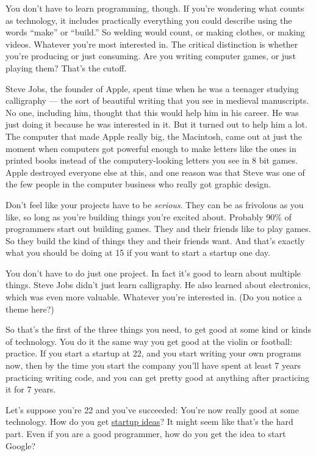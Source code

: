 You don't have to learn programming, though. If you're wondering what
counts as technology, it includes practically everything you could
describe using the words ``make'' or ``build.'' So welding would count,
or making clothes, or making videos. Whatever you're most interested in.
The critical distinction is whether you're producing or just consuming.
Are you writing computer games, or just playing them? That's the cutoff.

Steve Jobs, the founder of Apple, spent time when he was a teenager
studying calligraphy --- the sort of beautiful writing that you see in
medieval manuscripts. No one, including him, thought that this would
help him in his career. He was just doing it because he was interested
in it. But it turned out to help him a lot. The computer that made Apple
really big, the Macintosh, came out at just the moment when computers
got powerful enough to make letters like the ones in printed books
instead of the computery-looking letters you see in 8 bit games. Apple
destroyed everyone else at this, and one reason was that Steve was one
of the few people in the computer business who really got graphic
design.

Don't feel like your projects have to be \emph{serious}. They can be as
frivolous as you like, so long as you're building things you're excited
about. Probably 90\% of programmers start out building games. They and
their friends like to play games. So they build the kind of things they
and their friends want. And that's exactly what you should be doing at
15 if you want to start a startup one day.

You don't have to do just one project. In fact it's good to learn about
multiple things. Steve Jobs didn't just learn calligraphy. He also
learned about electronics, which was even more valuable. Whatever you're
interested in. (Do you notice a theme here?)

So that's the first of the three things you need, to get good at some
kind or kinds of technology. You do it the same way you get good at the
violin or football: practice. If you start a startup at 22, and you
start writing your own programs now, then by the time you start the
company you'll have spent at least 7 years practicing writing code, and
you can get pretty good at anything after practicing it for 7 years.

Let's suppose you're 22 and you've succeeded: You're now really good at
some technology. How do you get \href{startupideas.html}{startup ideas}?
It might seem like that's the hard part. Even if you are a good
programmer, how do you get the idea to start Google?

